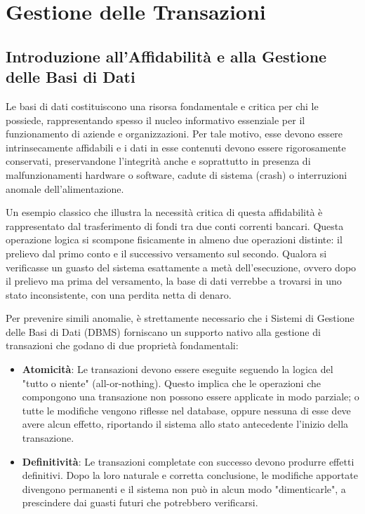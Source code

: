 
\chapter{Gestione delle Transazioni}

\section{Introduzione all'Affidabilità e alla Gestione delle Basi di Dati}

Le basi di dati costituiscono una risorsa fondamentale e critica per chi le possiede, rappresentando spesso il nucleo informativo essenziale per il funzionamento di aziende e organizzazioni. Per tale motivo, esse devono essere intrinsecamente affidabili e i dati in esse contenuti devono essere rigorosamente conservati, preservandone l'integrità anche e soprattutto in presenza di malfunzionamenti hardware o software, cadute di sistema (crash) o interruzioni anomale dell'alimentazione.

Un esempio classico che illustra la necessità critica di questa affidabilità è rappresentato dal trasferimento di fondi tra due conti correnti bancari. Questa operazione logica si scompone fisicamente in almeno due operazioni distinte: il prelievo dal primo conto e il successivo versamento sul secondo. Qualora si verificasse un guasto del sistema esattamente a metà dell'esecuzione, ovvero dopo il prelievo ma prima del versamento, la base di dati verrebbe a trovarsi in uno stato inconsistente, con una perdita netta di denaro.

Per prevenire simili anomalie, è strettamente necessario che i Sistemi di Gestione delle Basi di Dati (DBMS) forniscano un supporto nativo alla gestione di transazioni che godano di due proprietà fondamentali:
\begin{itemize}
    \item \textbf{Atomicità}: Le transazioni devono essere eseguite seguendo la logica del "tutto o niente" (all-or-nothing). Questo implica che le operazioni che compongono una transazione non possono essere applicate in modo parziale; o tutte le modifiche vengono riflesse nel database, oppure nessuna di esse deve avere alcun effetto, riportando il sistema allo stato antecedente l'inizio della transazione.
    \item \textbf{Definitività}: Le transazioni completate con successo devono produrre effetti definitivi. Dopo la loro naturale e corretta conclusione, le modifiche apportate divengono permanenti e il sistema non può in alcun modo "dimenticarle", a prescindere dai guasti futuri che potrebbero verificarsi.
\end{itemize}

